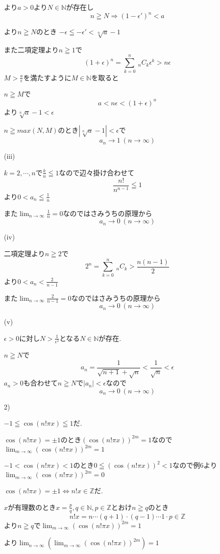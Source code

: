 \documentclass{jsarticle}
\begin{document}
より$a>0$より$N\in\mathbb{N}$が存在し
\[n\geqq N \Rightarrow (1-\epsilon')^n < a\]

より$n\geqq N$のとき
$-\epsilon \leqq -\epsilon' < \sqrt[n]{a}-1$

また二項定理より$n\geqq 1$で
\[(1+\epsilon)^n = \sum_{k=0}^n \ _nC_k  \epsilon ^k > n\epsilon\]
$M > \frac{a}{\epsilon}$を満たすように$M\in \mathbb{N}$を取ると

$n\geqq M$で
\[a < n\epsilon < (1+\epsilon)^n\]
より$\sqrt[n]{a}-1 < \epsilon$

$n\geqq max(N,M)$のとき$|\sqrt[n]{a}-1| < \epsilon$で
\[a_n\to1 \ (n\to \infty)\]

(iii)

$k=2,\cdots,n$で$\frac{k}{n}\leqq 1$なので辺々掛け合わせて
\[\frac{n!}{n^{n-1}}\leqq 1\]
より$0<a_n\leqq \frac{1}{n}$

また$\displaystyle\lim_{n\to \infty}\frac{1}{n}=0$なのではさみうちの原理から
\[a_n\to 0 \ (n\to \infty)\]

(iv)

二項定理より$n\geqq 2$で
\[2^n =\sum_{k=0}^n \ _nC_k > \frac{n(n-1)}{2}\]
より$0<a_n<\frac{2}{n-1}$

また$\displaystyle\lim_{n\to \infty}\frac{2}{n-1}=0$なのではさみうちの原理から
\[a_n\to 0 \ (n\to \infty)\]

(v)

$\epsilon > 0$に対し$N>\frac{1}{\epsilon ^2}$となる$N\in \mathbb{N}$が存在.

$n\geqq N$で
\[a_n=\frac{1}{\sqrt{n+1}+\sqrt{n}}<\frac{1}{\sqrt{n}}<\epsilon\]
$a_n>0$も合わせて$n\geqq N$で$|a_n|<\epsilon$なので
\[a_n\to 0 \ (n\to \infty)\]

2)

$-1\leqq \cos(n!\pi x) \leqq 1$だ.

$\cos(n!\pi x) = \pm 1$のとき$(\cos(n!\pi x))^{2m} = 1$なので$\displaystyle\lim_{m\to \infty} (\cos(n!\pi x))^{2m} = 1$

$-1<\cos(n!\pi x) < 1$のとき$0 \leqq (\cos(n!\pi x))^2 < 1$なので例6より$\displaystyle \lim_{m\to \infty} (\cos(n!\pi x))^{2m} = 0$

$\cos(n!\pi x) = \pm 1\Leftrightarrow n!x \in \mathbb{Z} $だ.

$x$が有理数のとき$x=\frac{p}{q},q\in \mathbb{N},p\in \mathbb{Z}$とおけ$n\geqq q$のとき
\[n!x = n\cdots (q+1)\cdot (q-1) \cdots  1 \cdot p \in \mathbb{Z}\]
より$n\geqq q$で$\displaystyle\lim_{m\to \infty} (\cos(n!\pi x))^{2m} = 1$

より$\displaystyle\lim_{n\to \infty}(\lim_{m\to \infty} (\cos(n!\pi x))^{2m}) = 1$
\end{document}
